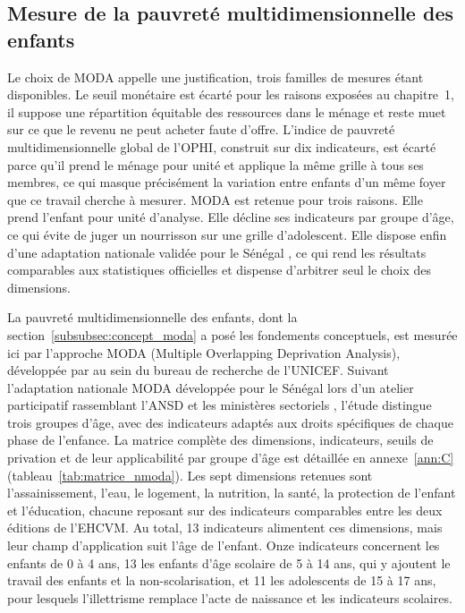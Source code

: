 \subsection{Mesure de la pauvreté multidimensionnelle des enfants}

Le choix de MODA appelle une justification, trois familles de mesures étant
disponibles. Le seuil monétaire est écarté pour les raisons exposées au
chapitre~1, il suppose une répartition équitable des ressources dans le ménage
et reste muet sur ce que le revenu ne peut acheter faute d'offre. L'indice
de pauvreté multidimensionnelle global de l'OPHI, construit sur dix indicateurs,
est écarté parce qu'il prend le ménage pour unité et applique la même grille à
tous ses membres, ce qui masque précisément la variation entre enfants d'un même
foyer que ce travail cherche à mesurer. MODA est retenue pour trois
raisons. Elle prend l'enfant pour unité d'analyse. Elle décline ses indicateurs
par groupe d'âge, ce qui évite de juger un nourrisson sur une grille
d'adolescent. Elle dispose enfin d'une adaptation nationale validée pour le
Sénégal \parencite{ansd2024}, ce qui rend les résultats comparables aux
statistiques officielles et dispense d'arbitrer seul le choix des dimensions.

La pauvreté multidimensionnelle des enfants, dont la
section~\ref{subsubsec:concept_moda} a posé les fondements conceptuels, est
mesurée ici par l'approche MODA (Multiple Overlapping Deprivation
Analysis), développée par \textcite{deneubourg2012} au sein du bureau de
recherche de l'UNICEF. Suivant l'adaptation nationale MODA développée
pour le Sénégal lors d'un atelier participatif rassemblant l'ANSD et les
ministères sectoriels \parencite{ansd2024}, l'étude distingue trois groupes
d'âge, avec des indicateurs adaptés aux droits spécifiques de chaque phase de
l'enfance. La matrice complète des dimensions, indicateurs, seuils de privation
et de leur applicabilité par groupe d'âge est détaillée en
annexe~\ref{ann:C} (tableau~\ref{tab:matrice_nmoda}).
Les sept dimensions retenues sont l'assainissement, l'eau, le logement, la
nutrition, la santé, la protection de l'enfant et l'éducation, chacune reposant
sur des indicateurs comparables entre les deux éditions de l'EHCVM. Au total,
13 indicateurs alimentent ces dimensions, mais leur champ d'application
suit l'âge de l'enfant. Onze indicateurs concernent les enfants de 0 à 4 ans,
13 les enfants d'âge scolaire de 5 à 14 ans, qui y ajoutent le travail des
enfants et la non-scolarisation, et 11 les adolescents de 15 à 17 ans, pour
lesquels l'illettrisme remplace l'acte de naissance et les indicateurs
scolaires.

